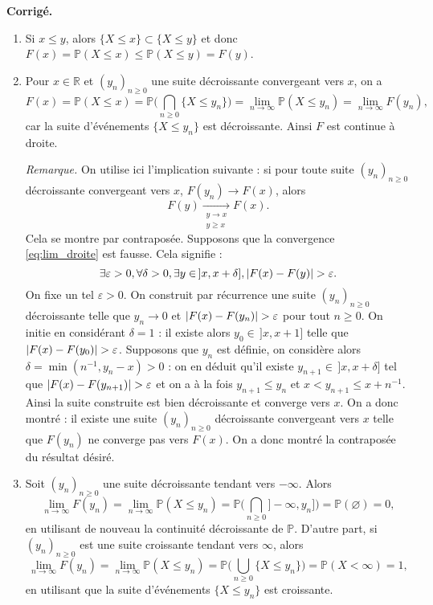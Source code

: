 \documentclass[a4paper,11pt]{article}
\let\originalleft\left
\let\originalright\right
\renewcommand{\left}{\mathopen{}\mathclose\bgroup\originalleft}
\renewcommand{\right}{\aftergroup\egroup\originalright}
\newcommand{\R}{\mathbb{R}}
\renewcommand{\P}{\mathbb{P}}
\newcommand{\1}{\mathbbm{1}}
\newcommand{\abs}[1]{\left\lvert#1\right\rvert}
\theoremstyle{plain}
\theoremstyle{definition}
\renewenvironment{comment}{\medskip\noindent \textcolor{BrickRed}{\textbf{Corrigé.}}}{}
\begin{document}
\begin{comment}
\begin{enumerate}
	\item Si $x \leq y$, alors $\{ X \leq x \} \subset \{X \leq y\}$ et donc $F(x) = \P(X \leq x) \leq \P(X \leq y) = F(y)$.
	\item Pour $x \in \R$ et $(y_n)_{n\geq0}$ une suite décroissante convergeant vers $x$, on a
	\[
		F(x)
		= \P(X \leq x)
		= \P \Biggl( \bigcap_{n\geq0} \{ X \leq y_n \} \Biggr)
		= \lim_{n\to\infty} \P(X \leq y_n)
		= \lim_{n\to\infty} F(y_n),
	\]
	car la suite d'événements $\{ X \leq y_n \}$ est décroissante. Ainsi $F$ est continue à droite.
	
	\emph{Remarque.} On utilise ici l'implication suivante : si pour toute suite $(y_n)_{n\geq0}$ décroissante convergeant vers $x$, $F(y_n) \to F(x)$, alors 
	\begin{equation}\label{eq:lim_droite}
	F(y) \xrightarrow[\substack{y \to x\\y\geq x}]{} F(x).
	\end{equation}
	Cela se montre par contraposée. Supposons que la convergence \eqref{eq:lim_droite} est fausse. Cela signifie : 
	\[
	\exists \varepsilon > 0, \forall \delta > 0, \exists y \in \,]x,x+\delta], \abs{F(x) - F(y)} > \varepsilon.
	\]
	On fixe un tel $\varepsilon > 0$.
	On construit par récurrence une suite $(y_n)_{n\geq0}$ décroissante telle que $y_n \to 0$ et $\abs{F(x) - F(y_n)} > \varepsilon$ pour tout $n \geq 0$. On initie en considérant $\delta =1$ : il existe alors $y_0 \in \,]x,x+1]$ telle que $\abs{F(x) - F(y_0)} > \varepsilon$. Supposons que $y_n$ est définie, on considère alors $\delta = \min(n^{-1},y_n-x) > 0$ : on en déduit qu'il existe $y_{n+1} \in \,]x,x+\delta]$ tel que $\abs{F(x) - F(y_{n+1})} > \varepsilon$ et on a à la fois $y_{n+1} \leq y_n$ et $x < y_{n+1} \leq x + n^{-1}$.
	Ainsi la suite construite est bien décroissante et converge vers $x$.
	On a donc montré : il existe une suite $(y_n)_{n\geq0}$ décroissante convergeant vers $x$ telle que $F(y_n)$ ne converge pas vers $F(x)$.
	On a donc montré la contraposée du résultat désiré.
	\item Soit $(y_n)_{n\geq0}$ une suite décroissante tendant vers $-\infty$. Alors
	      \[
		      \lim_{n\to\infty} F(y_n)
		      = \lim_{n\to\infty} \P(X \leq y_n)
		      = \P \Biggl( \bigcap_{n\geq0} ]-\infty,y_n] \Biggr)
		      = \P(\varnothing)
		      =0,
	      \]
	      en utilisant de nouveau la continuité décroissante de $\P$.
	      D'autre part, si $(y_n)_{n\geq0}$ est une suite croissante tendant vers $\infty$, alors
	      \[
		      \lim_{n\to\infty} F(y_n)
		      = \lim_{n\to\infty} \P(X \leq y_n)
		      = \P \Biggl( \bigcup_{n\geq0} \{ X \leq y_n \} \Biggr)
		      = \P(X < \infty)
		      = 1,
	      \]
	      en utilisant que la suite d'événements $\{ X \leq y_n \}$ est croissante.
\end{enumerate}
\end{comment}
\end{document}
